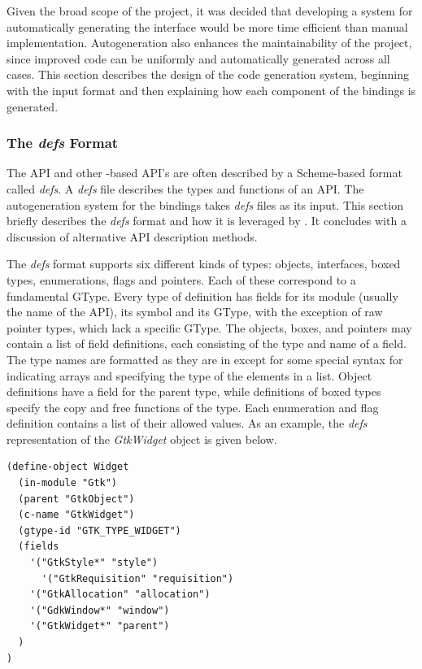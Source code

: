 \documentclass[article]{jss}
\begin{document}
Given the broad scope of the project, it was decided that developing a system
for automatically generating the interface would be more time efficient than
manual implementation. Autogeneration also enhances the maintainability of the 
project, since improved code can be uniformly and automatically generated across
all cases. This section describes the design of the code generation system,
beginning with the input format and then explaining how each component of
the bindings is generated.

\subsubsection[The defs Format]{The \emph{defs} Format}

The  API and other -based API's are often described by
a Scheme-based format called \emph{defs}. A \emph{defs} file describes the types
and functions of an API. The autogeneration system for the  bindings
takes \emph{defs} files as its input. This section briefly describes the 
\emph{defs} format and how it is leveraged by . It concludes
with a discussion of alternative API description methods.

The \emph{defs} format supports six different kinds of types: objects, 
interfaces, boxed types, enumerations, flags 
and pointers. Each of these correspond to a fundamental GType. Every
type of definition has fields for its module (usually the name of the API),
its  symbol and its GType, with the exception of raw pointer types,
which lack a specific GType. The objects, boxes, and pointers may contain a 
list of field definitions, each consisting of the
type and name of a field. The type names are formatted as they are in 
except for some special syntax for indicating arrays and specifying the type
of the elements in a list. Object definitions have a field for the parent type, while 
definitions of boxed types specify the copy and free functions of the type.
Each enumeration and flag definition contains a list of their allowed values.
As an example, the \emph{defs} representation of the \emph{GtkWidget} object
is given below.
\begin{verbatim}
(define-object Widget
  (in-module "Gtk")
  (parent "GtkObject")
  (c-name "GtkWidget")
  (gtype-id "GTK_TYPE_WIDGET")
  (fields
    '("GtkStyle*" "style")
	  '("GtkRequisition" "requisition")
    '("GtkAllocation" "allocation")
    '("GdkWindow*" "window")
    '("GtkWidget*" "parent")
  )
)
\end{verbatim}
\end{document}
